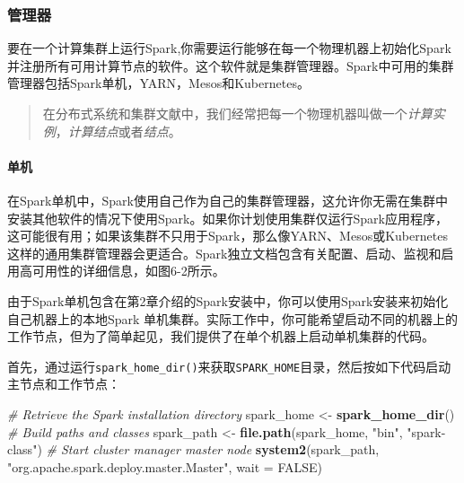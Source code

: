 \documentclass[
]{article}
\newenvironment{Shaded}{\begin{snugshade}}{\end{snugshade}}
\newcommand{\CommentTok}[1]{\textcolor[rgb]{0.56,0.35,0.01}{\textit{#1}}}
\newcommand{\DataTypeTok}[1]{\textcolor[rgb]{0.13,0.29,0.53}{#1}}
\newcommand{\KeywordTok}[1]{\textcolor[rgb]{0.13,0.29,0.53}{\textbf{#1}}}
\newcommand{\NormalTok}[1]{#1}
\newcommand{\OtherTok}[1]{\textcolor[rgb]{0.56,0.35,0.01}{#1}}
\newcommand{\StringTok}[1]{\textcolor[rgb]{0.31,0.60,0.02}{#1}}
\begin{document}
\hypertarget{ux7ba1ux7406ux5668}{%
\subsubsection{管理器}\label{ux7ba1ux7406ux5668}}

要在一个计算集群上运行Spark,你需要运行能够在每一个物理机器上初始化Spark并注册所有可用计算节点的软件。这个软件就是集群管理器。Spark中可用的集群管理器包括Spark单机，YARN，Mesos和Kubernetes。

\begin{quote}
在分布式系统和集群文献中，我们经常把每一个物理机器叫做一个\emph{计算实例}，\emph{计算结点}或者\emph{结点}。
\end{quote}

\hypertarget{ux5355ux673a}{%
\paragraph{单机}\label{ux5355ux673a}}

在Spark单机中，Spark使用自己作为自己的集群管理器，这允许你无需在集群中安装其他软件的情况下使用Spark。如果你计划使用集群仅运行Spark应用程序，这可能很有用；如果该集群不只用于Spark，那么像YARN、Mesos或Kubernetes这样的通用集群管理器会更适合。Spark独立文档包含有关配置、启动、监视和启用高可用性的详细信息，如图6-2所示。

由于Spark单机包含在第2章介绍的Spark安装中，你可以使用Spark安装来初始化自己机器上的本地Spark
单机集群。实际工作中，你可能希望启动不同的机器上的工作节点，但为了简单起见，我们提供了在单个机器上启动单机集群的代码。

首先，通过运行\texttt{spark\_home\_dir()}来获取\texttt{SPARK\_HOME}目录，然后按如下代码启动主节点和工作节点：

\begin{Shaded}
\begin{Highlighting}[]
\CommentTok{# Retrieve the Spark installation directory}
\NormalTok{spark_home <-}\StringTok{ }\KeywordTok{spark_home_dir}\NormalTok{()}
\CommentTok{# Build paths and classes}
\NormalTok{spark_path <-}\StringTok{ }\KeywordTok{file.path}\NormalTok{(spark_home, }\StringTok{"bin"}\NormalTok{, }\StringTok{"spark-class"}\NormalTok{)}
\CommentTok{# Start cluster manager master node}
\KeywordTok{system2}\NormalTok{(spark_path, }\StringTok{"org.apache.spark.deploy.master.Master"}\NormalTok{, }\DataTypeTok{wait =} \OtherTok{FALSE}\NormalTok{)}
\end{Highlighting}
\end{Shaded}
\end{document}

